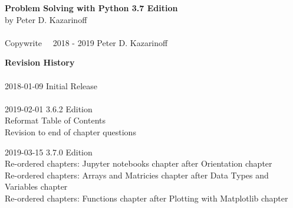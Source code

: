 
\textbf{Problem Solving with Python 3.7 Edition} \\
by Peter D. Kazarinoff \\
\\
Copywrite \  \textcopyright \  2018 - 2019 Peter D. Kazarinoff\\

\vspace{3in}

\textbf{Revision History}\\
\\
2018-01-09 Initial Release\\
\\
2019-02-01 3.6.2 Edition\\
Reformat Table of Contents\\
Revision to end of chapter questions

2019-03-15 3.7.0 Edition \\
Re-ordered chapters: Jupyter notebooks chapter after Orientation chapter \\
Re-ordered chapters: Arrays and Matricies chapter after Data Types and Variables chapter \\
Re-ordered chapters: Functions chapter after Plotting with Matplotlib chapter \\
